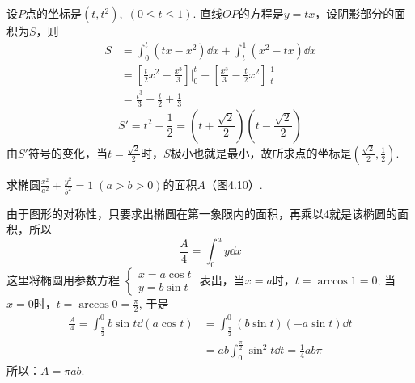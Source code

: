 \begin{figure}[htp]\centering
        \caption{}
    \end{figure}

\begin{solution}
    设$P$点的坐标是$(t,t^2),\; (0\le t\le 1)$. 直线$OP$的方程是$y=tx$，设阴影部分的面积为$S$，则
\[\begin{split}
S&=\int^t_0 (tx-x^2)\dd x+\int^1_t (x^2-tx)\dd x\\
&=\left[\frac{t}{2}x^2-\frac{x^3}{3}\right]\Bigg|^t_0+\left[\frac{x^3}{3}-\frac{t}{2}x^2\right]\Bigg|^1_t\\
&=\frac{t^3}{3}-\frac{t}{2}+\frac{1}{3}
\end{split}\]
\[S'=t^2-\frac{1}{2}=\left(t+\frac{\sqrt{2}}{2}\right)\left(t-\frac{\sqrt{2}}{2}\right)\]
由$S'$符号的变化，当$t=\frac{\sqrt{2}}{2}$时，$S$极小也就是最小，故所求点的坐标是$\left(\frac{\sqrt{2}}{2},\frac{1}{2}\right)$.
\end{solution}

\begin{example}
    求椭圆$\frac{x^2}{a^2}+\frac{y^2}{b^2}=1\; (a>b>0)$的面积$A$（图4.10）.
\end{example}

\begin{figure}[htp]
    \centering
{}
    \caption{}
\end{figure}

\begin{solution}
由于图形的对称性，只要求出椭圆在第一象限内的面积，再乘以4就是该椭圆的面积，所以
\[\frac{A}{4}=\int^a_0 y\dd x\]
这里将椭圆用参数方程
$\begin{cases}
    x=a\cos t\\ y=b\sin t
\end{cases}$
表出，当$x=a$时，$t=\arccos 1=0$; 当$x=0$时，$t=\arccos 0=\frac{\pi}{2}$, 于是
\[\begin{split}
    \frac{A}{4}=\int^0_{\tfrac{\pi}{2}}b\sin t \dd(a\cos t)&=\int^0_{\tfrac{\pi}{2}}(b\sin t )(-a\sin t)\dd t\\
&=ab \int^{\tfrac{\pi}{2}}_0 \sin^2 t\dd t=\frac{1}{4}ab\pi 
\end{split}\]
所以：$A=\pi ab$.
\end{solution}

